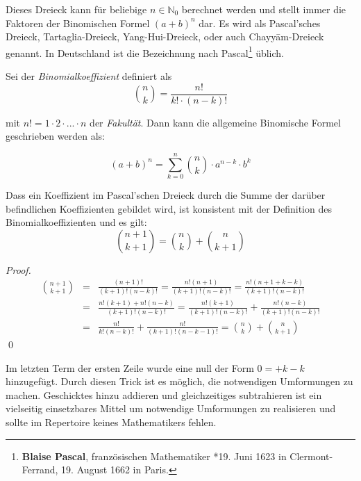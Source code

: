 Dieses Dreieck kann für beliebige $n\in \mathbb{N}_0$ berechnet werden und stellt immer die Faktoren der Binomischen Formel $(a+b)^n$ dar. Es wird als Pascal'sches Dreieck, Tartaglia-Dreieck, Yang-Hui-Dreieck, oder auch Chayy\={a}m-Dreieck genannt. In Deutschland ist die Bezeichnung nach Pascal\footnote{\textbf{Blaise Pascal}, französischen Mathematiker *19. Juni 1623 in Clermont-Ferrand, 19. August 1662 in Paris.} üblich.

\begin{definition}
Sei der \textsl{Binomialkoeffizient} definiert als 
\[
	\binom{n}{k} = \frac{n!}{k!\cdot (n-k)!}
\]
\end{definition}
mit $n! = 1\cdot 2\cdot ... \cdot n$ der \textsl{Fakultät}. Dann kann die allgemeine Binomische Formel geschrieben werden als:

\begin{equation}
(a+b)^n = \sum_{k=0}^{n} \binom{n}{k} \cdot a^{n-k}\cdot b^k
\end{equation}

\begin{claim}
Dass ein Koeffizient im Pascal'schen Dreieck durch die Summe der darüber befindlichen Koeffizienten gebildet wird, ist konsistent mit der Definition des Binomialkoeffizienten und es gilt:
\[
\binom{n+1}{k+1} = \binom{n}{k} + \binom{n}{k+1}
\]
\end{claim}

\begin{proof}
\begin{eqnarray*}
\binom{n+1}{k+1} &=& \frac{(n+1)!}{(k+1)!(n-k)!} = \frac{n!(n+1)}{(k+1)!(n-k)!} = \frac{n!(n+1+k-k)}{(k+1)!(n-k)!} \\
&=& \frac{n!(k+1) +n!(n-k)}{(k+1)!(n-k)!} = \frac{n!(k+1)}{(k+1)!(n-k)!}+\frac{n!(n-k)}{(k+1)!(n-k)!} \\
&=& \frac{n!}{k!(n-k)!} + \frac{n!}{(k+1)!(n-k-1)!} = \binom{n}{k}+\binom{n}{k+1}
\end{eqnarray*}
\qed
\end{proof}

\HandRight \qquad Im letzten Term der ersten Zeile wurde eine null der Form $0=+k-k$ hinzugefügt. Durch diesen Trick ist es möglich, die notwendigen Umformungen zu machen. Geschicktes hinzu addieren und gleichzeitiges subtrahieren ist ein vielseitig einsetzbares Mittel um notwendige Umformungen zu realisieren und sollte im Repertoire keines Mathematikers fehlen. 

